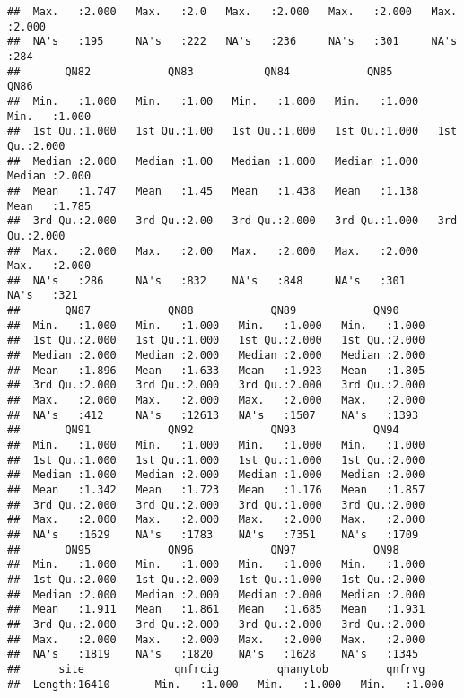 \documentclass[
]{article}
\begin{document}
\begin{verbatim}
##  Max.   :2.000   Max.   :2.0   Max.   :2.000   Max.   :2.000   Max.   :2.000  
##  NA's   :195     NA's   :222   NA's   :236     NA's   :301     NA's   :284    
##       QN82            QN83           QN84            QN85            QN86      
##  Min.   :1.000   Min.   :1.00   Min.   :1.000   Min.   :1.000   Min.   :1.000  
##  1st Qu.:1.000   1st Qu.:1.00   1st Qu.:1.000   1st Qu.:1.000   1st Qu.:2.000  
##  Median :2.000   Median :1.00   Median :1.000   Median :1.000   Median :2.000  
##  Mean   :1.747   Mean   :1.45   Mean   :1.438   Mean   :1.138   Mean   :1.785  
##  3rd Qu.:2.000   3rd Qu.:2.00   3rd Qu.:2.000   3rd Qu.:1.000   3rd Qu.:2.000  
##  Max.   :2.000   Max.   :2.00   Max.   :2.000   Max.   :2.000   Max.   :2.000  
##  NA's   :286     NA's   :832    NA's   :848     NA's   :301     NA's   :321    
##       QN87            QN88            QN89            QN90      
##  Min.   :1.000   Min.   :1.000   Min.   :1.000   Min.   :1.000  
##  1st Qu.:2.000   1st Qu.:1.000   1st Qu.:2.000   1st Qu.:2.000  
##  Median :2.000   Median :2.000   Median :2.000   Median :2.000  
##  Mean   :1.896   Mean   :1.633   Mean   :1.923   Mean   :1.805  
##  3rd Qu.:2.000   3rd Qu.:2.000   3rd Qu.:2.000   3rd Qu.:2.000  
##  Max.   :2.000   Max.   :2.000   Max.   :2.000   Max.   :2.000  
##  NA's   :412     NA's   :12613   NA's   :1507    NA's   :1393   
##       QN91            QN92            QN93            QN94      
##  Min.   :1.000   Min.   :1.000   Min.   :1.000   Min.   :1.000  
##  1st Qu.:1.000   1st Qu.:1.000   1st Qu.:1.000   1st Qu.:2.000  
##  Median :1.000   Median :2.000   Median :1.000   Median :2.000  
##  Mean   :1.342   Mean   :1.723   Mean   :1.176   Mean   :1.857  
##  3rd Qu.:2.000   3rd Qu.:2.000   3rd Qu.:1.000   3rd Qu.:2.000  
##  Max.   :2.000   Max.   :2.000   Max.   :2.000   Max.   :2.000  
##  NA's   :1629    NA's   :1783    NA's   :7351    NA's   :1709   
##       QN95            QN96            QN97            QN98      
##  Min.   :1.000   Min.   :1.000   Min.   :1.000   Min.   :1.000  
##  1st Qu.:2.000   1st Qu.:2.000   1st Qu.:1.000   1st Qu.:2.000  
##  Median :2.000   Median :2.000   Median :2.000   Median :2.000  
##  Mean   :1.911   Mean   :1.861   Mean   :1.685   Mean   :1.931  
##  3rd Qu.:2.000   3rd Qu.:2.000   3rd Qu.:2.000   3rd Qu.:2.000  
##  Max.   :2.000   Max.   :2.000   Max.   :2.000   Max.   :2.000  
##  NA's   :1819    NA's   :1820    NA's   :1628    NA's   :1345   
##      site              qnfrcig         qnanytob         qnfrvg     
##  Length:16410       Min.   :1.000   Min.   :1.000   Min.   :1.000  

\end{verbatim}
\end{document}
